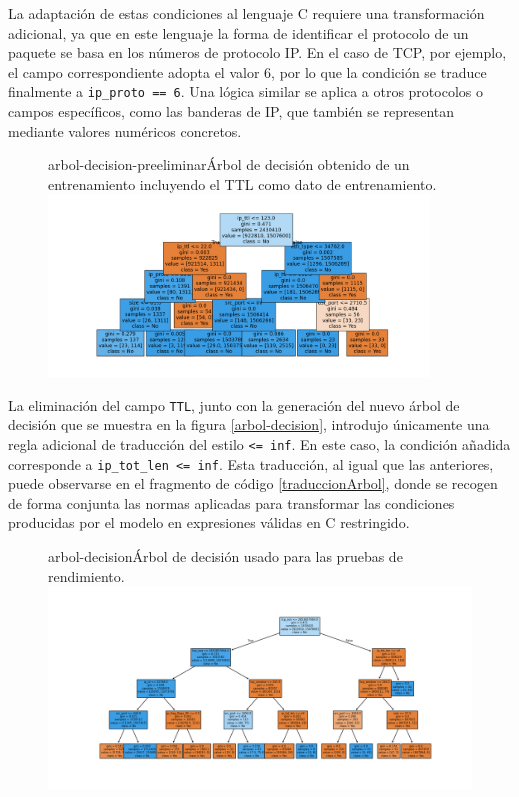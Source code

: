 La adaptación de estas condiciones al lenguaje C requiere una transformación adicional, ya que en este lenguaje la forma de identificar el protocolo de un paquete se basa en los números de protocolo IP. En el caso de TCP, por ejemplo, el campo correspondiente adopta el valor 6, por lo que la condición se traduce finalmente a \verb|ip_proto == 6|. Una lógica similar se aplica a otros protocolos o campos específicos, como las banderas de IP, que también se representan mediante valores numéricos concretos.

\begin{figure}[Árbol de Decisión Preeliminar]{arbol-decision-preeliminar}{Árbol de decisión obtenido de un entrenamiento incluyendo el TTL como dato de entrenamiento.}
	\includegraphics[width=0.9\textwidth]{capturas/arbolrw1_mej.png}
\end{figure}

La eliminación del campo \verb|TTL|, junto con la generación del nuevo árbol de decisión que se muestra en la figura \ref{arbol-decision}, introdujo únicamente una regla adicional de traducción del estilo \verb|<= inf|. En este caso, la condición añadida corresponde a \verb|ip_tot_len <= inf|. Esta traducción, al igual que las anteriores, puede observarse en el fragmento de código \ref{traduccionArbol}, donde se recogen de forma conjunta las normas aplicadas para transformar las condiciones producidas por el modelo en expresiones válidas en C restringido.

\begin{figure}[Árbol de Decisión]{arbol-decision}{Árbol de decisión usado para las pruebas de rendimiento.}
	\includegraphics[width=1\textwidth]{capturas/arbolrw2.png}
\end{figure}

